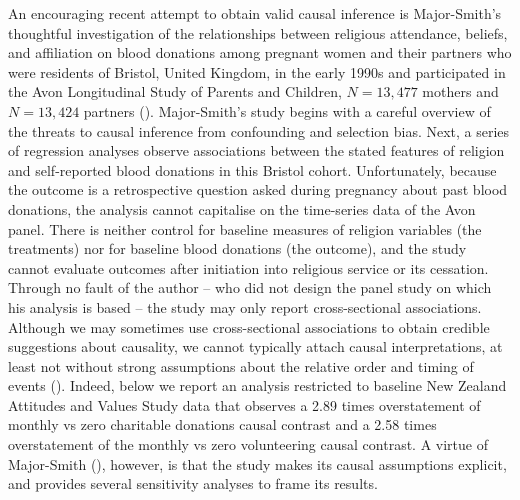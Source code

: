 \documentclass[
  single column]{article}
\begin{document}
An encouraging recent attempt to obtain valid causal inference is
Major-Smith's thoughtful investigation of the relationships between
religious attendance, beliefs, and affiliation on blood donations among
pregnant women and their partners who were residents of Bristol, United
Kingdom, in the early 1990s and participated in the Avon Longitudinal
Study of Parents and Children, \(N=13,477\) mothers and \(N=13,424\)
partners ().
Major-Smith's study begins with a careful overview of the threats to
causal inference from confounding and selection bias. Next, a series of
regression analyses observe associations between the stated features of
religion and self-reported blood donations in this Bristol cohort.
Unfortunately, because the outcome is a retrospective question asked
during pregnancy about past blood donations, the analysis cannot
capitalise on the time-series data of the Avon panel. There is neither
control for baseline measures of religion variables (the treatments) nor
for baseline blood donations (the outcome), and the study cannot
evaluate outcomes after initiation into religious service or its
cessation. Through no fault of the author -- who did not design the
panel study on which his analysis is based -- the study may only report
cross-sectional associations. Although we may sometimes use
cross-sectional associations to obtain credible suggestions about
causality, we cannot typically attach causal interpretations, at least
not without strong assumptions about the relative order and timing of
events (). Indeed,
below we report an analysis restricted to baseline New Zealand Attitudes
and Values Study data that observes a 2.89 times overstatement of
monthly vs zero charitable donations causal contrast and a 2.58 times
overstatement of the monthly vs zero volunteering causal contrast. A
virtue of Major-Smith (),
however, is that the study makes its causal assumptions explicit, and
provides several sensitivity analyses to frame its results.
\end{document}
